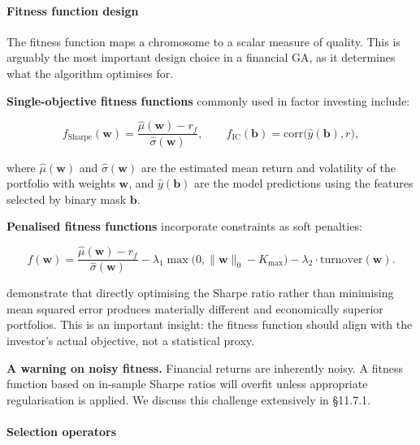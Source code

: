\bigskip

\paragraph{Fitness function design}

The fitness function maps a chromosome to a scalar measure of quality. This is arguably the most important design choice in a financial GA, as it determines what the algorithm optimises for.

\textbf{Single-objective fitness functions} commonly used in factor investing include:

\begin{equation}
f_{\text{Sharpe}}(\mathbf{w}) = \frac{\hat{\mu}(\mathbf{w}) - r_f}{\hat{\sigma}(\mathbf{w})}, \qquad f_{\text{IC}}(\mathbf{b}) = \text{corr}\big(\hat{y}(\mathbf{b}), r\big), \tag{11.1}
\end{equation}

where $\hat{\mu}(\mathbf{w})$ and $\hat{\sigma}(\mathbf{w})$ are the estimated mean return and volatility of the portfolio with weights $\mathbf{w}$, and $\hat{y}(\mathbf{b})$ are the model predictions using the features selected by binary mask $\mathbf{b}$.

\textbf{Penalised fitness functions} incorporate constraints as soft penalties:

\begin{equation}
f(\mathbf{w}) = \frac{\hat{\mu}(\mathbf{w}) - r_f}{\hat{\sigma}(\mathbf{w})} - \lambda_1 \max\big(0, \|\mathbf{w}\|_0 - K_{\max}\big) - \lambda_2 \cdot \text{turnover}(\mathbf{w}). \tag{11.2}
\end{equation}

\cite{Liu2020} demonstrate that directly optimising the Sharpe ratio rather than minimising mean squared error produces materially different and economically superior portfolios. This is an important insight: the fitness function should align with the investor's actual objective, not a statistical proxy.

\textbf{A warning on noisy fitness.} Financial returns are inherently noisy. A fitness function based on in-sample Sharpe ratios will overfit unless appropriate regularisation is applied. We discuss this challenge extensively in §11.7.1.

\paragraph{Selection operators}

